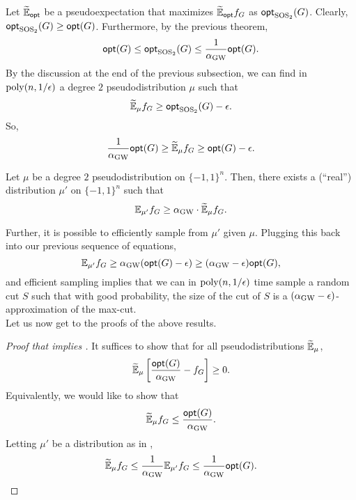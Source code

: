 	Let $\widetilde{\mathbb{E}}_{\mathsf{opt}}$ be a pseudoexpectation that maximizes $\widetilde{\mathbb{E}}_{\mathsf{opt}} f_G$ as $\mathsf{opt}_{\text{SOS}_2}(G)$. Clearly, $\mathsf{opt}_{\text{SOS}_2}(G) \ge \mathsf{opt}(G)$. Furthermore, by the previous theorem,
	\[ \mathsf{opt}(G) \le \mathsf{opt}_{\text{SOS}_2}(G) \le \frac{1}{\alpha_{\text{GW}}} \mathsf{opt}(G). \]
	By the discussion at the end of the previous subsection, we can find in $\operatorname{poly}(n,1/\epsilon)$ a degree $2$ pseudodistribution $\mu$ such that
	\[ \widetilde{\mathbb{E}}_\mu f_G \ge \mathsf{opt}_{\text{SOS}_2}(G) - \epsilon. \]
	So,
	\[ \frac{1}{\alpha_{\text{GW}}} \mathsf{opt}(G) \ge \widetilde{\mathbb{E}}_\mu f_G \ge \mathsf{opt}(G) - \epsilon. \]

	\begin{flem}
		\label{lem: gw-pd-to-rd}
		Let $\mu$ be a degree $2$ pseudodistribution on $\{-1,1\}^n$. Then, there exists a (``real'') distribution $\mu'$ on $\{-1,1\}^n$ such that
		\[ \mathbb{E}_{\mu'} f_G \ge \alpha_{\text{GW}} \cdot \widetilde{\mathbb{E}}_{\mu} f_G. \]
	\end{flem}
	Further, it is possible to efficiently sample from $\mu'$ given $\mu$. Plugging this back into our previous sequence of equations,
	\[ \mathbb{E}_{\mu'} f_G \ge \alpha_{\text{GW}}(\mathsf{opt}(G) - \epsilon) \ge (\alpha_{\text{GW}} - \epsilon) \mathsf{opt}(G), \]
	and efficient sampling implies that we can in $\operatorname{poly}(n,1/\epsilon)$ time sample a random cut $S$ such that with good probability, the size of the cut of $S$ is a $(\alpha_{\text{GW}}-\epsilon)$-approximation of the max-cut.\\
	Let us now get to the proofs of the above results.

	\begin{proof}[Proof that  implies ]
		It suffices to show that for all pseudodistributions $\widetilde{\mathbb{E}}_\mu$,
		\[ \widetilde{\mathbb{E}}_\mu \left[ \frac{\mathsf{opt}(G)}{\alpha_{\text{GW}}} - f_G \right] \ge 0. \]
		Equivalently, we would like to show that
		\[ \widetilde{\mathbb{E}}_\mu f_G \le \frac{\mathsf{opt}(G)}{\alpha_{\text{GW}}}. \]
		Letting $\mu'$ be a distribution as in ,
		\[ \widetilde{\mathbb{E}}_\mu f_G \le \frac{1}{\alpha_{\text{GW}}} \mathbb{E}_{\mu'} f_G \le \frac{1}{\alpha_{\text{GW}}} \mathsf{opt}(G). \qedhere \]
	\end{proof}

